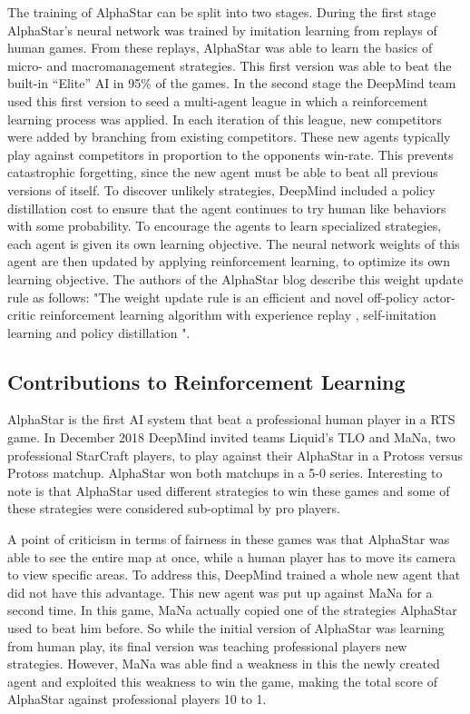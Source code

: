 The training of AlphaStar can be split into two stages. During the first stage AlphaStar’s neural network was trained by imitation learning from replays of human games. From these replays, AlphaStar was able to learn the basics of micro- and macromanagement strategies. This first version was able to beat the built-in “Elite” AI in 95\% of the games. In the second stage the DeepMind team used this first version to seed a multi-agent league in which a reinforcement learning process was applied. In each iteration of this league, new competitors were added by branching from existing competitors. These new agents typically play against competitors in proportion to the opponents win-rate. This prevents catastrophic forgetting, since the new agent must be able to beat all previous versions of itself. To discover unlikely strategies, DeepMind included a policy distillation cost to ensure that the agent continues to try human like behaviors with some probability. To encourage the agents to learn specialized strategies, each agent is given its own learning objective. The neural network weights of this agent are then updated by applying  reinforcement learning, to optimize its own learning objective. The authors of the AlphaStar blog describe this weight update rule as follows: 
"The weight update rule is an efficient and novel off-policy actor-critic \citep{espeholt2018impala} reinforcement learning algorithm with experience replay \citep{lin1992self}, self-imitation learning \citep{oh2018self} and policy distillation \citep{rusu2015policy}".

\subsection{Contributions to Reinforcement Learning}
AlphaStar is the first AI system that beat a professional human player in a RTS game. In December 2018 DeepMind invited teams Liquid's TLO and MaNa, two professional StarCraft players, to play against their AlphaStar in a Protoss versus Protoss matchup. AlphaStar won both matchups in a 5-0 series. Interesting to note is that AlphaStar used different strategies to win these games and some of these strategies were considered sub-optimal by pro players.

A point of criticism in terms of fairness in these games was that AlphaStar was able to see the entire map at once, while a human player has to move its camera to view specific areas. To address this, DeepMind trained a whole new agent that did not have this advantage. This new agent was put up against MaNa for a second time. In this game, MaNa actually copied one of the strategies AlphaStar used to beat him before. So while the initial version of AlphaStar was learning from human play, its final version was teaching professional players new strategies. However, MaNa was able find a weakness in this the newly created agent and exploited this weakness to win the game, making the total score of AlphaStar against professional players 10 to 1.

